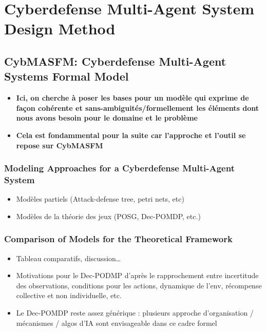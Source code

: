 \chapter{Cyberdefense Multi-Agent System Design Method}\label{ch:cybmasdm} %

\section{CybMASFM: Cyberdefense Multi-Agent Systems Formal Model}\label{sec:cybmasfm}

\begin{itemize}
    \item \textbf{Ici, on cherche à poser les bases pour un modèle qui exprime de façon cohérente et sans-ambiguités/formellement les éléments dont nous avons besoin pour le domaine et le problème}
    \item \textbf{Cela est fondammental pour la suite car l'approche et l'outil se repose sur CybMASFM}
\end{itemize}

\subsection{Modeling Approaches for a Cyberdefense Multi-Agent System}
\begin{itemize}

    \item Modèles partiels (Attack-defense tree, petri nets, etc)
    \item Modèles de la théorie des jeux (POSG, Dec-POMDP, etc.)
\end{itemize}

\subsection{Comparison of Models for the Theoretical Framework}
\begin{itemize}

    \item Tableau comparatifs, discussion…
    \item Motivations pour le Dec-PODMP d’après le rapprochement entre incertitude des observations, conditions pour les actions, dynamique de l’env, récompense collective et non individuelle, etc.
    \item Le Dec-POMDP reste assez générique : plusieurs approche d’organisation / mécanismes / algos d’IA sont envisageable dans ce cadre formel
\end{itemize}


